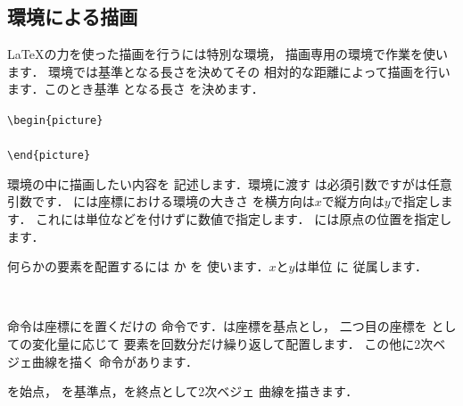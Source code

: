 \subsection{環境による描画}
{\LaTeX}の力を使った描画を行うには特別な環境，
描画専用の環境で作業を使います．
環境では基準となる長さを決めてその
相対的な距離によって描画を行います．このとき基準
となる長さ を決めます．
\begin{Syntax}
\verb+\begin{picture}+\\
\\
\verb+\end{picture}+
\end{Syntax}
環境の中に描画したい内容を
記述します．環境に渡す
は必須引数ですがは任意引数です．
には座標における環境の大きさ
を横方向は$x$で縦方向は$y$で指定します．
これには単位などを付けずに数値で指定します．
には原点の位置を指定します．

何らかの要素を配置するには か を
使います．$x$と$y$は単位 に
従属します．
\begin{Syntax}
\\
%
\end{Syntax}
命令は座標にを置くだけの
命令です．は座標を基点とし，
二つ目の座標を
としての変化量に応じて
要素を回数分だけ繰り返して配置します．
この他に2次ベジェ曲線を描く 命令があります．
\begin{Syntax}
\end{Syntax}
を始点，
を基準点，を終点として2次ベジェ
曲線を描きます．

